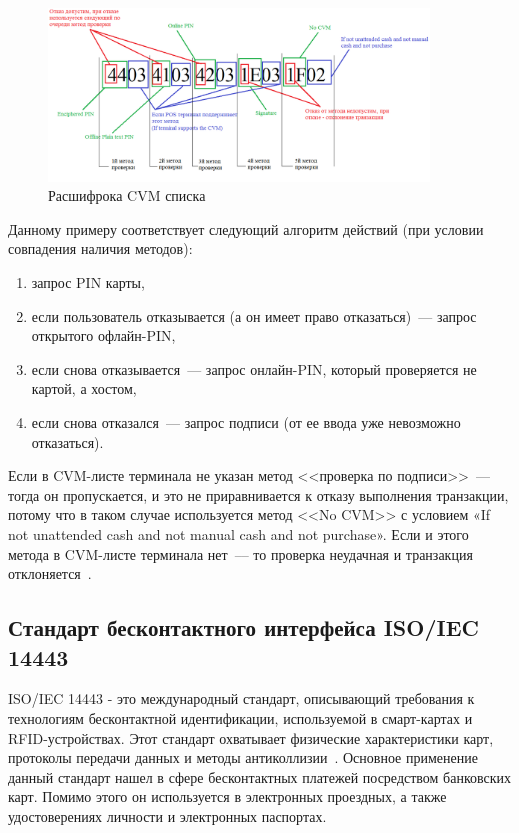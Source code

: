 \begin{figure}[H]
    \centering
    \includegraphics[width=0.9\textwidth]{images/research/cvm_check}
    \caption{\centering Расшифрока CVM списка}
    \label{fig:cvm_check}
\end{figure}

Данному примеру соответствует следующий алгоритм действий (при условии совпадения наличия методов):

\begin{enumerate}
    \item запрос PIN карты,
    \item если пользователь отказывается (а он имеет право отказаться)~--- запрос открытого офлайн-PIN,
    \item если снова отказывается~--- запрос онлайн-PIN, который проверяется не картой, а хостом,
    \item если снова отказался~--- запрос подписи (от ее ввода уже невозможно отказаться).
\end{enumerate}

Если в CVM-листе терминала не указан метод <<проверка по подписи>>~--- тогда он пропускается, и это не приравнивается к отказу выполнения транзакции, потому что в таком случае используется метод <<No CVM>> с условием «If not unattended cash and not manual cash and not purchase».
Если и этого метода в CVM-листе терминала нет~--– то проверка неудачная и транзакция отклоняется~\cite{habr_cvm}.


\subsection{Стандарт бесконтактного интерфейса ISO/IEC 14443}
\label{subsec:iso_14443}

ISO/IEC 14443 - это международный стандарт, описывающий требования к технологиям бесконтактной идентификации, используемой в смарт-картах и
RFID-устройствах. 
Этот стандарт охватывает физические характеристики карт, протоколы передачи данных и методы антиколлизии~\cite{iso_14443_en}.
Основное применение данный стандарт нашел в сфере бесконтактных платежей посредством банковских карт.
Помимо этого он используется в электронных проездных, а также удостоверениях личности и электронных паспортах.

